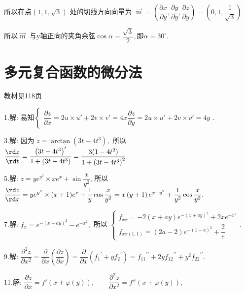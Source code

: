   所以在点$ (1,1,\sqrt 3 ) $ 处的切线方向向量为 $ \mathop m\limits^ \to   = (\dfrac{{\partial x}}{{\partial y}},\dfrac{{\partial y}}{{\partial y}},\dfrac{{\partial z}}{{\partial y}}) = (0,1,\dfrac{1}{{\sqrt 3 }})$

  所以$ \mathop m\limits^ \to   $
  与y轴正向的夹角余弦$ \cos \alpha  = \dfrac{{\sqrt 3 }}{2}, $即$ \alpha  = {30^ \circ }. $

\section{多元复合函数的微分法}
\begin{flushright}
  \color{zhanqing!80}
   教材见118页
\end{flushright}

  1.解:  易知\(\begin{cases}
  \dfrac{{\partial z}}{{\partial x}} = 2u \times u' + 2v \times v' = 4x
  \dfrac{{\partial z}}{{\partial y}} = 2u \times u' + 2v \times v' = 4y
  \end{cases}.\)

  3.解:  因为 $ z = \arctan \left( {3t - 4{t^3}} \right), $
  所以 $ \dfrac{{\rd z}}{{\rd t}} = \dfrac{{{{\left( {3t - 4{t^3}} \right)}^\prime }}}{{1 + \left( {3t - 4{t^3}} \right)}} = \dfrac{{3(1 - 4{t^2})}}{{1 + {{\left( {3t - 4{t^3}} \right)}^2}}}. $

  5.解:  $ z = y{e^{{y^2}}} \times x{e^x} + \sin \dfrac{x}{{{y^2}}}$,
  所以 $ \dfrac{{\rd z}}{{\rd x}} = y{e^{{y^2}}} \times (x + 1){e^x} + \dfrac{1}{y}\cos \dfrac{x}{{{y^2}}} = x\left( {y + 1} \right){e^{x + {y^2}}} + \dfrac{1}{{{y^2}}}\cos \dfrac{x}{{{y^2}}}. $

  7.解:  $ {f_x} = {e^{ - {{(x + ay)}^2}}} - {e^{ - {x^2}}}, $
  所以
  $\begin{cases}
  {f_{xx}} =  - 2\left( {x + ay} \right){e^{ - {{\left( {x + ay} \right)}^2}}} + 2x{e^{ - {x^2}}} \\
  {f_{xx(1,1)}} = (2a - 2){e^{ - {{(1 - a)}^2}}} + \dfrac{2}{e}
  \end{cases}$.

  9.解:  $ \dfrac{{{\partial ^2}z}}{{\partial {x^2}}}
  = \dfrac{\partial }{{\partial x}}\left( {\dfrac{{\partial z}}{{\partial x}}} \right)
  = \dfrac{\partial }{{\partial x}}\left( {{f_1}^\prime  + y{f_2}^\prime } \right)
  = {f_{11}}^{\prime \prime } + 2y{f_{12}}^{\prime \prime } + {y^2}{f_{22}}^{\prime \prime }. $

  11.解:  $ \dfrac{{\partial z}}{{\partial x}} = f'\left( {x + \varphi \left( y \right)} \right), \qquad
  \dfrac{{{\partial ^2}z}}{{\partial {x^2}}} = f''\left( {x + \varphi \left( y \right)} \right), $

